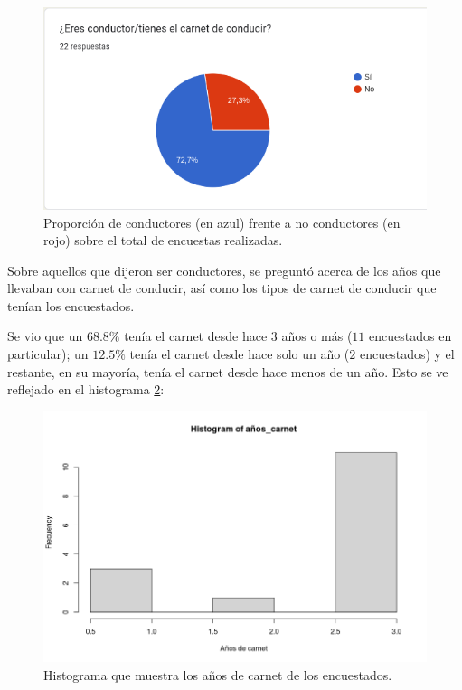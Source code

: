 \begin{figure}[H]
  \centering
  \includegraphics[width=\linewidth]{images/drivers-nodrivers.png}
  \caption{Proporción de conductores (en azul) frente a no conductores (en rojo) sobre el total de encuestas realizadas.}
  \label{fig:drivers-nodrivers}
\end{figure}

Sobre aquellos que dijeron ser conductores, se preguntó acerca de los años que
llevaban con carnet de conducir, así como los tipos de carnet de conducir que tenían
los encuestados.

Se vio que un $68.8\%$ tenía el carnet desde hace 3 años o más ($11$ encuestados
en particular); un $12.5\%$ tenía el carnet desde hace solo un año ($2$ encuestados)
y el restante, en su mayoría, tenía el carnet desde hace menos de un año. Esto se ve
reflejado en el histograma \ref{fig:carnet-time-hist}:

\begin{figure}[H]
  \centering
  \includegraphics[width=\linewidth]{images/carnet-time.png}
  \caption{Histograma que muestra los años de carnet de los encuestados.}
  \label{fig:carnet-time-hist}
\end{figure}

